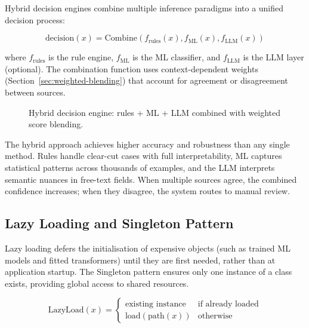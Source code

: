 \documentclass[10pt,a4paper]{article}
\begin{document}
Hybrid decision engines combine multiple inference paradigms into a unified decision process:

\begin{equation}
\text{decision}(x) = \text{Combine}(f_{\text{rules}}(x), f_{\text{ML}}(x), f_{\text{LLM}}(x))
\label{eq:hybrid-engine}
\end{equation}

where $f_{\text{rules}}$ is the rule engine, $f_{\text{ML}}$ is the ML classifier, and $f_{\text{LLM}}$ is the LLM layer (optional). The combination function uses context-dependent weights (Section~\ref{sec:weighted-blending}) that account for agreement or disagreement between sources.

\begin{figure}[H]
    \centering
    \caption{Hybrid decision engine: rules + ML + LLM combined with weighted score blending.}
    \label{fig:hybrid-engine}
\end{figure}

The hybrid approach achieves higher accuracy and robustness than any single method. Rules handle clear-cut cases with full interpretability, ML captures statistical patterns across thousands of examples, and the LLM interprets semantic nuances in free-text fields. When multiple sources agree, the combined confidence increases; when they disagree, the system routes to manual review.

\subsection{Lazy Loading and Singleton Pattern}
\label{sec:lazy-loading}

Lazy loading defers the initialisation of expensive objects (such as trained ML models and fitted transformers) until they are first needed, rather than at application startup. The Singleton pattern ensures only one instance of a class exists, providing global access to shared resources.

\begin{equation}
\text{LazyLoad}(x) = \begin{cases} \text{existing instance} & \text{if already loaded} \\ \text{load}(\text{path}(x)) & \text{otherwise} \end{cases}
\label{eq:lazy-load}
\end{equation}
\end{document}
